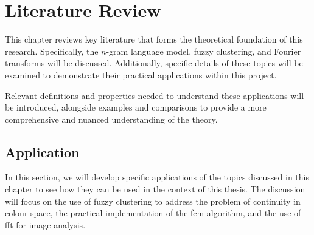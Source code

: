 \chapter{Literature Review}
\label{chap:LiteratureReview}
This chapter reviews key literature that forms the theoretical foundation of this research. Specifically, the $n$-gram language model, fuzzy clustering, and Fourier transforms will be discussed. Additionally, specific details of these topics will be examined to demonstrate their practical applications within this project.

\noindent Relevant definitions and properties needed to understand these applications will be introduced, alongside examples and comparisons to provide a more comprehensive and nuanced understanding of the theory.




\section{Application}
\begin{modified}
In this section, we will develop specific applications of the topics discussed in this chapter to see how they can be used in the context of this thesis. The discussion will focus on the use of fuzzy clustering to address the problem of continuity in colour space, the practical implementation of the \gls{fcm} algorithm, and the use of \gls{fft} for image analysis.
\end{modified}
